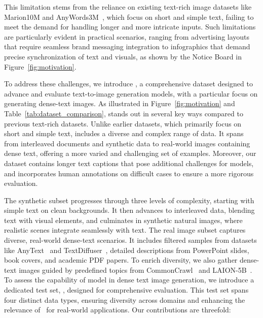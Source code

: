 This limitation stems from the reliance on existing text-rich image datasets like Marion10M and AnyWords3M~\cite{anytext,textdiffuser2}, which focus on short and simple text, failing to meet the demand for handling longer and more intricate inputs. 
Such limitations are particularly evident in practical scenarios, ranging from advertising layouts that require seamless brand messaging integration to infographics that demand precise synchronization of text and visuals, as shown by the Notice Board in Figure~\ref{fig:motivation}.





To address these challenges, we introduce \DatasetName, a comprehensive dataset designed to advance and evaluate text-to-image generation models, with a particular focus on generating dense-text images. 
As illustrated in Figure~\ref{fig:motivation} and Table~\ref{tab:dataset_comparison}, \DatasetName stands out in several key ways compared to previous text-rich datasets. 
Unlike earlier datasets, which primarily focus on short and simple text, \DatasetName includes a diverse and complex range of data. 
It spans from interleaved documents and synthetic data to real-world images containing dense text, offering a more varied and challenging set of examples. 
Moreover, our dataset contains longer text captions that pose additional challenges for models, and incorporates human annotations on difficult cases to ensure a more rigorous evaluation.

The synthetic subset progresses through three levels of complexity, starting with simple text on clean backgrounds. 
It then advances to interleaved data, blending text with visual elements, and culminates in synthetic natural images, where realistic scenes integrate seamlessly with text.
The real image subset captures diverse, real-world dense-text scenarios. 
It includes filtered samples from datasets like AnyText~\cite{anytext} and TextDiffuser~\cite{textdiffuser}, detailed descriptions from PowerPoint slides, book covers, and academic PDF papers. 
To enrich diversity, we also gather dense-text images guided by predefined topics from CommonCrawl~\cite{commoncrawl} and LAION-5B~\cite{laion}.
To assess the capability of model in dense text image generation, we introduce a dedicated test set, \EvalDatasetName, designed for comprehensive evaluation. 
This test set spans four distinct data types, ensuring diversity across domains and enhancing the relevance of \DatasetName~for real-world applications. 
Our contributions are threefold: 

